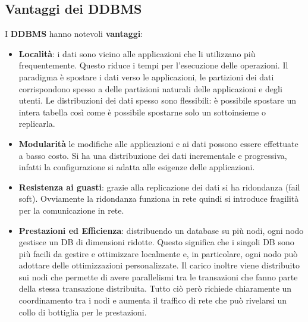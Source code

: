 \subsection{Vantaggi dei DDBMS}
I \textbf{DDBMS} hanno notevoli \textbf{vantaggi}:
\begin{itemize}
      \item \textbf{Località}: i dati sono vicino alle applicazioni che li
            utilizzano più frequentemente. Questo riduce i tempi per l'esecuzione
            delle operazioni. Il paradigma è spostare i dati verso le
            applicazioni, le partizioni dei dati corrispondono spesso a delle
            partizioni naturali delle applicazioni e degli utenti. Le
            distribuzioni dei dati spesso sono flessibili: è possibile spostare un
            intera tabella così come è possibile spostarne solo un sottoinsieme
            o replicarla.
      \item \textbf{Modularità} le modifiche alle applicazioni e ai dati possono
            essere effettuate a basso costo. Si ha una distribuzione dei dati
            incrementale e progressiva, infatti la configurazione si adatta alle
            esigenze delle applicazioni.
      \item \textbf{Resistenza ai guasti}: grazie alla replicazione dei dati si ha
            ridondanza (fail soft). Ovviamente la ridondanza funziona in rete quindi
            si introduce fragilità per la comunicazione in rete.
      \item \textbf{Prestazioni ed Efficienza}: distribuendo un database su più
            nodi, ogni nodo gestisce un DB di dimensioni ridotte. Questo
            significa che i singoli DB sono più facili da gestire e ottimizzare
            localmente e, in particolare, ogni nodo può adottare delle
            ottimizzazioni personalizzate. Il carico inoltre viene distribuito
            sui nodi che permette di avere parallelismi tra le transazioni che fanno
            parte della stessa transazione distribuita.
            Tutto ciò però richiede chiaramente un coordinamento tra i
            nodi e aumenta il traffico di rete che può rivelarsi un collo di
            bottiglia per le prestazioni.
\end{itemize}
